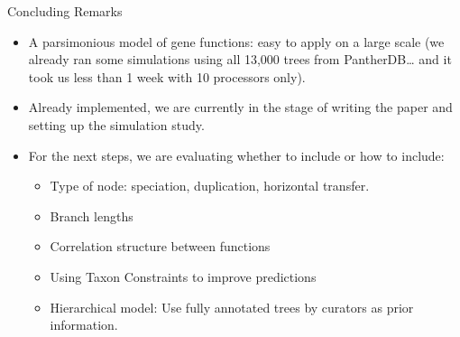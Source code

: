 \documentclass[9pt,ignorenonframetext,aspectratio=169]{beamer}
\begin{document}
\begin{frame}{Concluding Remarks}

\begin{itemize}
\item
  A parsimonious model of gene functions: easy to apply on a large scale
  (we already ran some simulations using all 13,000 trees from
  PantherDB\ldots{} and it took us less than 1 week with 10 processors
  only).\pause 
\item
  Already implemented, we are currently in the stage of writing the
  paper and setting up the simulation study.\pause
\item
  For the next steps, we are evaluating whether to include or how to
  include:\pause

  \begin{itemize}
  \item
    Type of node: speciation, duplication, horizontal transfer.
  \item
    Branch lengths
  \item
    Correlation structure between functions
  \item
    Using Taxon Constraints to improve predictions
  \item
    Hierarchical model: Use fully annotated trees by curators as prior
    information.
  \end{itemize}
\end{itemize}

\end{frame}

\begin{frame}{}

\begin{center}
\huge
{}
\end{center}

\maketitle

\appendix

\end{frame}
\end{document}

